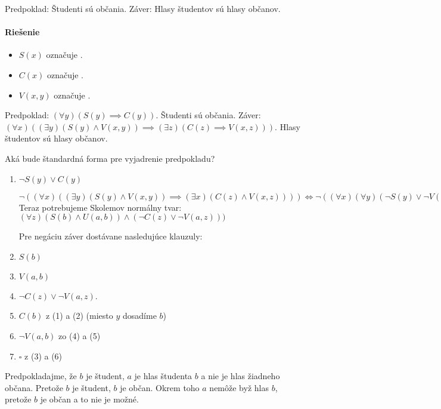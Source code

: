 \begin{priklad}
    Predpoklad: Študenti sú občania. Záver: Hlasy študentov sú
    hlasy občanov.

    \paragraph{Riešenie} 
    \begin{itemize}
            \item $S(x)$ označuje .
            \item $C(x)$ označuje .
            \item $V(x,y)$ označuje .
    \end{itemize}
    Predpoklad: $(\forall y) (S(y)\implies C(y))$. Študenti sú občania.
    Záver: $(\forall x) ((\exists y) (S(y) \land V(x,y)) \implies (\exists z)(C(z)
    \implies V(x,z)))$. Hlasy študentov sú hlasy občanov.

    Aká bude štandardná forma pre vyjadrenie predpokladu?
    \begin{enumerate}
            \item $\neg S(y) \lor C(y)$
                \par $\neg ((\forall x) ((\exists y)(S(y)\land V(x,y)) \implies
                (\exists x)(C(z) \land V(x,z)))) \iff 
                \neg ((\forall x)(\forall y)(\neg S(y)\lor \neg V(x,y)) \lor
                (\exists z)(C(z)\land V(x,z))) \iff 
                \neg ((\forall x)(\forall y)(\exists x)(\neg S(y) \lor
                \neg U(x,y)\lor (C(z) \land V(x,z)))) \iff
                (\exists x)(\exists y)(\forall z) (S(y) \land V(x,y)) \land
                (\neg C(z) \lor \neg V(x,z))$
                Teraz potrebujeme Skolemov normálny tvar:
                $(\forall z)(S(b) \land U(a,b)) \land(\neg C(z) \lor \neg
                V(a,z)))$
                \par Pre negáciu záver dostávane nasledujúce klauzuly:
            \item $S(b)$
            \item $V(a,b)$
            \item $\neg C(z) \lor \neg V(a,z)$.

            \item $C(b)$ z (1) a (2) (miesto $y$ dosadíme $b$)
            \item $\neg V(a,b)$ zo (4) a (5)
            \item $\square$ z (3)  a (6)
    \end{enumerate}

    \par Predpokladajme, že $b$ je študent, $a$ je hlas študenta $b$ a nie je hlas
    žiadneho občana. Pretože $b$ je študent, $b$ je občan. Okrem toho $a$ nemôže byž
    hlas $b$, pretože $b$ je občan a to nie je možné.
\end{priklad}
